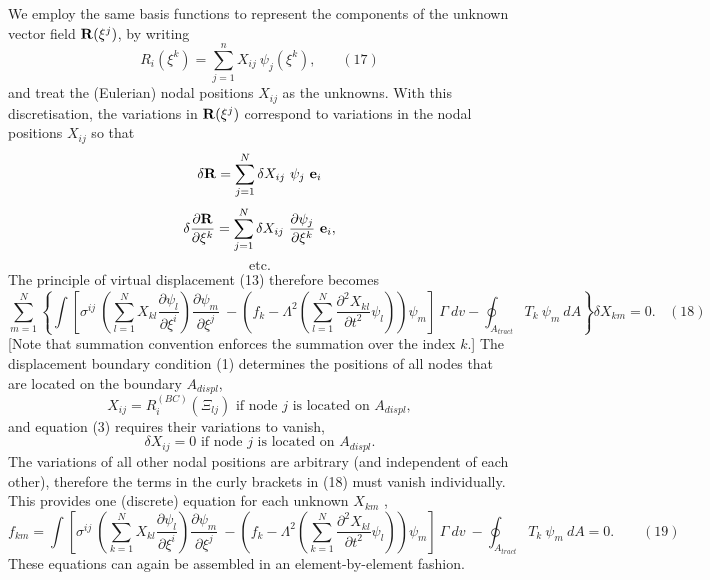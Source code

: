 We employ the same basis functions to represent the components of the unknown vector field $ {\bf R}(\xi^j)$, by writing \[ R_i(\xi^k) = \sum_{j=1}^{n} X_{ij} \ \psi_j(\xi^k), \ \ \ \ \ \ \ \ (17) \] and treat the (Eulerian) nodal positions $ X_{ij} $ as the unknowns. With this discretisation, the variations in $ {\bf R}(\xi^j) $ correspond to variations in the nodal positions $ X_{ij} $ so that \[ \delta {\bf R} = \sum_{j=1}^{N} \delta X_{ij} \ \psi_j \ {\bf e}_i \] \[ \delta \frac{\partial {\bf R}}{\partial \xi^k} = \sum_{j=1}^{N} \delta X_{ij} \ \frac{\partial \psi_j}{\partial \xi^k} \ {\bf e}_i, \] \[ \mbox{ etc. } \] The principle of virtual displacement (13) therefore becomes \[\sum_{m=1}^{N} \left\{ \int \left[ \sigma^{ij} \ \left(\sum_{l=1}^N X_{kl} \frac{\partial \psi_l}{\partial \xi^i} \right) \frac{\partial \psi_m}{\partial \xi^j} \ - \left( f_k - \Lambda^2 \left(\sum_{l=1}^N \frac{\partial^2 X_{kl}}{\partial t^2} \psi_l \right) \right) \psi_m \right] \ \Gamma \ dv - \oint_{A_{tract}} T_k \ \psi_m \ dA \right\} \delta X_{km} =0. \ \ \ \ (18) \] \mbox{[}Note that summation convention enforces the summation over the index $ k $.\mbox{]} The displacement boundary condition (1) determines the positions of all nodes that are located on the boundary $A_{displ}$, \[ X_{ij} = R^{(BC)}_i(\Xi_{lj}) \mbox{ \ \ \ if node $j$ is located on $A_{displ},$} \] and equation (3) requires their variations to vanish, \[ \delta X_{ij} = 0 \mbox{ \ \ \ if node $j$ is located on $A_{displ}.$} \] The variations of all other nodal positions are arbitrary (and independent of each other), therefore the terms in the curly brackets in (18) must vanish individually. This provides one (discrete) equation for each unknown $ X_{km} $ , \[ f_{km} = \int \left[ \sigma^{ij} \ \left(\sum_{k=1}^N X_{kl} \frac{\partial \psi_l}{\partial \xi^i} \right) \frac{\partial \psi_m}{\partial \xi^j} \ - \left( f_k - \Lambda^2 \left(\sum_{k=1}^N \frac{\partial^2 X_{kl}}{\partial t^2} \psi_l \right) \right) \psi_m \right] \ \Gamma \ dv \ - \oint_{A_{tract}} T_k \ \psi_m \ dA =0. \ \ \ \ \ \ \ \ \ (19) \] These equations can again be assembled in an element-\/by-\/element fashion.



 

